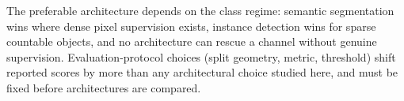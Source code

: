      {The preferable architecture depends on the class regime: semantic segmentation wins where dense pixel supervision exists, instance detection wins for sparse countable objects, and no architecture can rescue a channel without genuine supervision. Evaluation-protocol choices (split geometry, metric, threshold) shift reported scores by more than any architectural choice studied here, and must be fixed before architectures are compared.}



   \maketitle
